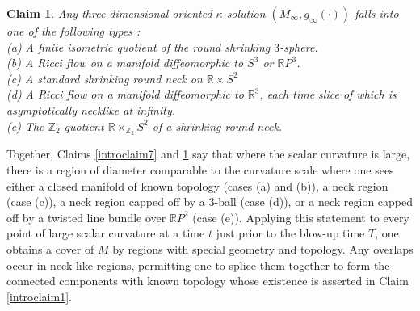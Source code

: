 \documentclass[12pt]{amsart}
\newcommand{\R}{{\mathbb R}}
\newcommand{\Z}{{\mathbb Z}}
\numberwithin{equation}{section}
\theoremstyle{plain}
\newtheorem{claim}[equation]{Claim}
\theoremstyle{definition}
\theoremstyle{remark}
\begin{document}
\begin{claim} \cite{Perelman2} \label{introclaim8}
Any three-dimensional oriented $\kappa$-solution $(M_\infty, g_\infty(\cdot))$ falls 
into one of the
following types : \\
(a) A finite isometric quotient of the round shrinking $3$-sphere. \\
(b) A Ricci flow on a  manifold  diffeomorphic to $S^3$ or $\R P^3$. \\
(c) A standard shrinking round neck on $\R \times S^2$ \\
(d) A Ricci flow on a manifold diffeomorphic to $\R^3$, each time slice of
which is  asymptotically necklike at infinity.\\
(e)  The  $\Z_2$-quotient $\R \times_{\Z_2} S^2$ of a  shrinking round neck. 
\end{claim}
Together, Claims \ref{introclaim7} and \ref{introclaim8} say that where the 
scalar curvature is large, there is a region of diameter comparable to the
curvature scale  where one  sees either a closed manifold of known topology
(cases (a) and (b)),  a neck region
(case (c)),  a neck region capped off by a $3$-ball (case (d)), or a neck
region capped off by a twisted line bundle over $\R P^2$ (case (e)).
Applying this statement to every point of large scalar curvature at a time $t$
just prior to the blow-up time $T$,
one obtains a cover of $M$ by regions with special geometry and topology.
Any  overlaps occur in neck-like regions, 
permitting one to splice them together to form the  connected  components
with known topology  whose existence is asserted in Claim \ref{introclaim1}.  
\end{document}
